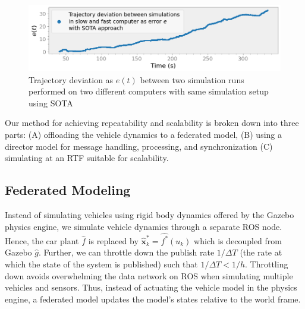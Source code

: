 \documentclass[aps,pra,twocolumn,notitlepage,nofootinbib,superscriptaddress]{revtex4-1}
\newcommand{\spliteq}[1]{\begin{equation}\begin{split}#1\end{split}\end{equation}}
\def\xbf{{\mathbf x}}
\begin{document}
\begin{figure}[h]

    \centering
    \includegraphics[clip,width=1.0\linewidth]{error_old.png}
    \caption{Trajectory deviation as $e(t)$ between two simulation runs performed on two different computers with same simulation setup using SOTA}
    \label{fig:error_old}

\end{figure}


Our method for achieving repeatability and scalability is broken down into three parts: (A) offloading the vehicle dynamics to a federated model, (B) using a director model for message handling, processing, and synchronization (C) simulating at an RTF suitable for scalability. 

\subsection{Federated Modeling}

Instead of simulating vehicles using rigid body dynamics offered by the Gazebo physics engine, we simulate vehicle dynamics through a separate ROS node.  Hence, the car plant $\hat{f}$ is replaced by 
$\hat{\xbf}_k^* = \hat{f^*}(u_k)$
which is decoupled from Gazebo $\hat{g}$. Further, we can throttle down the publish rate $1/\Delta T$ (the rate at which the state of the system is published) such that $1/\Delta T < 1/h$. Throttling down avoids overwhelming the data network on ROS when simulating multiple vehicles and sensors. Thus, instead of actuating the vehicle model in the physics engine, a federated model updates the model's states relative to the world frame.
\end{document}
